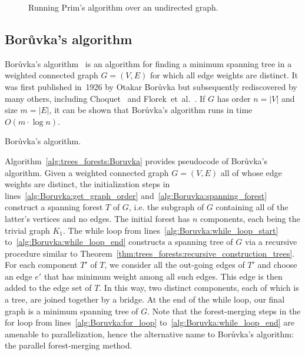 \begin{figure}[!htbp]
\centering

\caption{Running Prim's algorithm over an undirected graph.}
\label{fig:tree_forests:Prim_algorithm_undirected_graph}
\end{figure}



\subsection{Bor\r{u}vka's algorithm}
\label{subsec:trees_forests:Boruvka_algorithm}

Bor\r{u}vka's
algorithm~\cite{Boruvka1926a,Boruvka1926b}
is an algorithm for finding a minimum spanning tree in a weighted
connected graph $G = (V,E)$ for which all edge weights are
distinct. It was first published in~1926 by Otakar Bor\r{u}vka but
subsequently rediscovered by many others, including
Choquet~\cite{Choquet1938} and Florek~et~al.~\cite{FlorekEtAl1951}. If
$G$ has order $n = |V|$ and size $m = |E|$, it can be shown that
Bor\r{u}vka's algorithm runs in time $O(m \cdot \log n)$.

\begin{algorithm}[!htbp]

\caption{Bor\r{u}vka's algorithm.}
\label{alg:trees_forests:Boruvka}
\end{algorithm}

Algorithm~\ref{alg:trees_forests:Boruvka} provides pseudocode of
Bor\r{u}vka's algorithm. Given a weighted connected graph $G = (V,E)$
all of whose edge weights are distinct, the initialization steps in
lines~\ref{alg:Boruvka:get_graph_order}
and~\ref{alg:Boruvka:spanning_forest} construct a spanning forest $T$
of $G$, i.e. the subgraph of $G$ containing all of the latter's
vertices and no edges. The initial forest has $n$ components, each
being the trivial graph $K_1$. The while loop from
lines~\ref{alg:Boruvka:while_loop_start}
to~\ref{alg:Boruvka:while_loop_end} constructs a spanning tree of $G$
via a recursive procedure similar to
Theorem~\ref{thm:trees_forests:recursive_construction_trees}. For each
component $T'$ of $T$, we consider all the out-going edges of $T'$ and
choose an edge $e'$ that has minimum weight among all such edges. This
edge is then added to the edge set of $T$. In this way, two distinct
components, each of which is a tree, are joined together by a
bridge. At the end of the while loop, our final graph is a minimum
spanning tree of $G$. Note that the forest-merging steps in the for
loop from lines~\ref{alg:Boruvka:for_loop}
to~\ref{alg:Boruvka:while_loop_end} are amenable to parallelization,
hence the alternative name to Bor\r{u}vka's algorithm: the parallel
forest-merging method.

